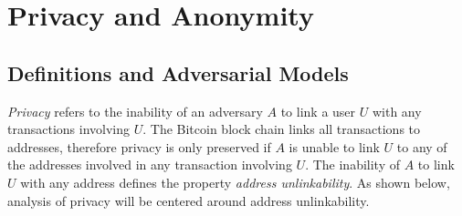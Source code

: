 \section{Privacy and Anonymity}


\subsection{Definitions and Adversarial Models}
\emph{Privacy} refers to the inability of an adversary $A$ to link a user $U$ with any transactions involving $U$. The Bitcoin block chain links all transactions to addresses, therefore privacy is only preserved if $A$ is unable to link $U$ to any of the addresses involved in any transaction involving $U$. The inability of $A$ to link $U$ with any address defines the property \emph{address unlinkability}. As shown below, analysis of privacy will be centered around address unlinkability.

